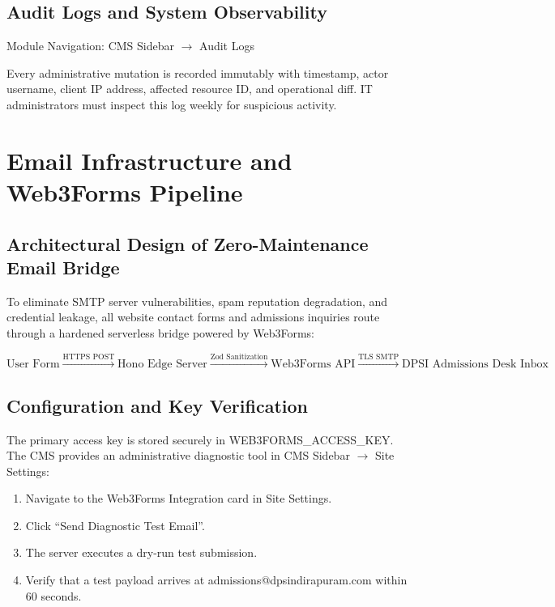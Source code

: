 \documentclass[11pt,a4paper,oneside]{report}
\def\textbf#1{#1}
\def\texttt#1{#1}
\def\&{and}
\newcommand{\envvar}[1]{\texttt{\textbf{\textcolor{dpsnavy}{#1}}}}
\begin{document}
\section{Audit Logs \& System Observability}

\textbf{Module Navigation:} CMS Sidebar $\rightarrow$ \texttt{Audit Logs}

Every administrative mutation is recorded immutably with timestamp, actor username,
client IP address, affected resource ID, and operational diff.
IT administrators must inspect this log weekly for suspicious activity.

\chapter{Email Infrastructure \texorpdfstring{\&}{and} Web3Forms Pipeline}

\section{Architectural Design of Zero-Maintenance Email Bridge}

To eliminate SMTP server vulnerabilities, spam reputation degradation, and credential
leakage, all website contact forms and admissions inquiries route through
a hardened serverless bridge powered by \textbf{Web3Forms}:

\begin{equation}
  \text{User Form} \xrightarrow{\text{HTTPS POST}} \text{Hono Edge Server}
  \xrightarrow{\text{Zod Sanitization}} \text{Web3Forms API}
  \xrightarrow{\text{TLS SMTP}} \text{DPSI Admissions Desk Inbox}
\end{equation}

\section{Configuration and Key Verification}

The primary access key is stored securely in \envvar{WEB3FORMS\_ACCESS\_KEY}.
The CMS provides an administrative diagnostic tool in \texttt{CMS Sidebar $\rightarrow$ Site Settings}:

\begin{enumerate}
  \item Navigate to the \textbf{Web3Forms Integration} card in Site Settings.
  \item Click \textbf{``Send Diagnostic Test Email''}.
  \item The server executes a dry-run test submission.
  \item Verify that a test payload arrives at \texttt{admissions@dpsindirapuram.com} within 60 seconds.
\end{enumerate}
\end{document}
